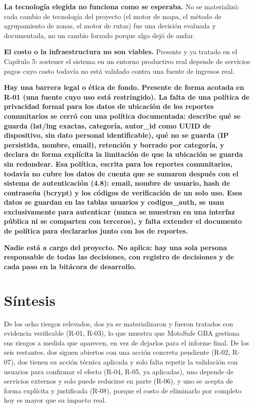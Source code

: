 \textbf{La tecnología elegida no funciona como se esperaba.} No se
materializó: cada cambio de tecnología del proyecto (el motor de mapa,
el método de agrupamiento de zonas, el motor de rutas) fue una decisión
evaluada y documentada, no un cambio forzado porque algo dejó de andar.

\textbf{El costo o la infraestructura no son viables.} Presente y ya
tratado en el Capítulo 5: sostener el sistema en un entorno productivo
real depende de servicios pagos cuyo costo todavía no está validado
contra una fuente de ingresos real.

\textbf{Hay una barrera legal o ética de fondo. Presente de forma
acotada en R-01 (una fuente cuyo uso está restringido). La falta de una
política de privacidad formal para los datos de ubicación de los
reportes comunitarios se cerró con una política documentada: describe
qué se guarda (lat/lng exactas, categoría, autor\_id como UUID de
dispositivo, sin dato personal identificable), qué no se guarda (IP
persistida, nombre, email), retención y borrado por categoría, y declara
de forma explícita la limitación de que la ubicación se guarda sin
redondear. Esa política, escrita para los reportes comunitarios, todavía
no cubre los datos de cuenta que se sumaron después con el sistema de
autenticación (4.8): email, nombre de usuario, hash de contraseña
(bcrypt) y los códigos de verificación de un solo uso. Esos datos se
guardan en las tablas usuarios y codigos\_auth, se usan exclusivamente
para autenticar (nunca se muestran en una interfaz pública ni se
comparten con terceros), y falta extender el documento de política para
declararlos junto con los de reportes.}

\textbf{Nadie está a cargo del proyecto. No aplica: hay una sola persona
responsable de todas las decisiones, con registro de decisiones y de
cada paso en la bitácora de desarrollo.}

\section{Síntesis}

De los ocho riesgos relevados, dos ya se materializaron y fueron
tratados con evidencia verificable (R-01, R-03), lo que muestra que
MotoSafe GBA gestiona sus riesgos a medida que aparecen, en vez de
dejarlos para el informe final. De los seis restantes, dos siguen
abiertos con una acción concreta pendiente (R-02, R-07), dos tienen su
acción técnica aplicada y solo falta repetir la validación con usuarios
para confirmar el efecto (R-04, R-05, ya aplicadas), uno depende de
servicios externos y solo puede reducirse en parte (R-06), y uno se
acepta de forma explícita y justificada (R-08), porque el costo de
eliminarlo por completo hoy es mayor que su impacto real.

